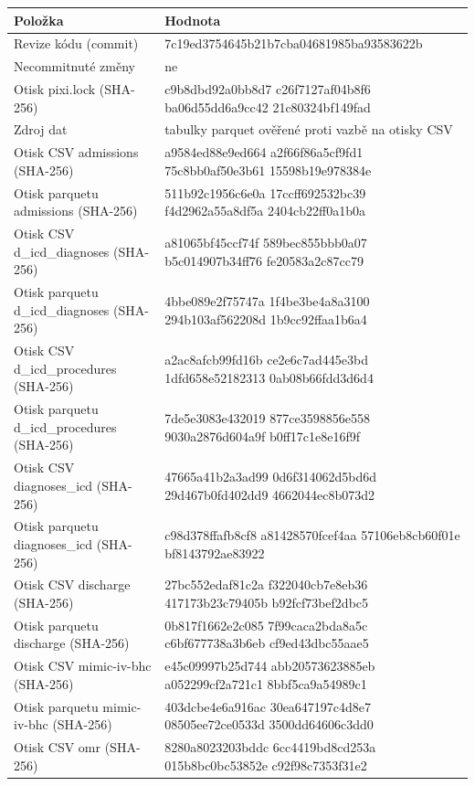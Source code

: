\begin{tabular}{>{\raggedright\arraybackslash}p{}>{\raggedright\arraybackslash}p{}}
\toprule
Položka & Hodnota\\
\midrule
Revize kódu (commit) & 7c19ed3754645b21b7cba04681985ba93583622b\\
Necommitnuté změny & ne\\
Otisk pixi.lock (SHA-256) & c9b8dbd92a0bb8d7 c26f7127af04b8f6 ba06d55dd6a9cc42 21c80324bf149fad\\
Zdroj dat & tabulky parquet ověřené proti vazbě na otisky CSV\\
Otisk CSV admissions (SHA-256) & a9584ed88e9ed664 a2f66f86a5cf9fd1 75c8bb0af50e3b61 15598b19e978384e\\
Otisk parquetu admissions (SHA-256) & 511b92c1956c6e0a 17ccff692532bc39 f4d2962a55a8df5a 2404cb22ff0a1b0a\\
Otisk CSV d\_icd\_diagnoses (SHA-256) & a81065bf45ccf74f 589bec855bbb0a07 b5c014907b34ff76 fe20583a2c87cc79\\
Otisk parquetu d\_icd\_diagnoses (SHA-256) & 4bbe089e2f75747a 1f4be3be4a8a3100 294b103af562208d 1b9cc92ffaa1b6a4\\
Otisk CSV d\_icd\_procedures (SHA-256) & a2ac8afcb99fd16b ce2e6c7ad445e3bd 1dfd658e52182313 0ab08b66fdd3d6d4\\
Otisk parquetu d\_icd\_procedures (SHA-256) & 7de5e3083e432019 877ce3598856e558 9030a2876d604a9f b0ff17c1e8e16f9f\\
Otisk CSV diagnoses\_icd (SHA-256) & 47665a41b2a3ad99 0d6f314062d5bd6d 29d467b0fd402dd9 4662044ec8b073d2\\
Otisk parquetu diagnoses\_icd (SHA-256) & c98d378ffafb8cf8 a81428570fcef4aa 57106eb8cb60f01e bf8143792ae83922\\
Otisk CSV discharge (SHA-256) & 27bc552edaf81c2a f322040cb7e8eb36 417173b23c79405b b92fcf73bef2dbc5\\
Otisk parquetu discharge (SHA-256) & 0b817f1662e2c085 7f99caca2bda8a5c c6bf677738a3b6eb cf9ed43dbc55aae5\\
Otisk CSV mimic-iv-bhc (SHA-256) & e45c09997b25d744 abb20573623885eb a052299cf2a721c1 8bbf5ca9a54989c1\\
Otisk parquetu mimic-iv-bhc (SHA-256) & 403dcbe4e6a916ac 30ea647197c4d8e7 08505ee72ce0533d 3500dd64606c3dd0\\
Otisk CSV omr (SHA-256) & 8280a8023203bddc 6cc4419bd8cd253a 015b8bc0bc53852e c92f98c7353f31e2\\

\end{tabular}

